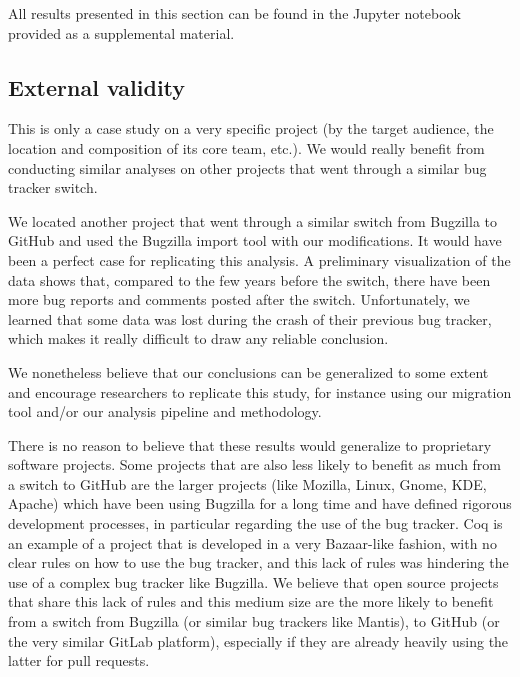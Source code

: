 \documentclass[conference]{IEEEtran}
\begin{document}
All results presented in this section can be found in the Jupyter notebook provided as a supplemental material. 
\subsection{External validity}

This is only a case study on a very specific project (by the target audience, the location and composition of its core team, etc.). We would really benefit from conducting similar analyses on other projects that went through a similar bug tracker switch.

We located another project that went through a similar switch from Bugzilla to GitHub and used the Bugzilla import tool with our modifications. It would have been a perfect case for replicating this analysis. A preliminary visualization of the data shows that, compared to the few years before the switch, there have been more bug reports and comments posted after the switch. Unfortunately, we learned that some data was lost during the crash of their previous bug tracker, which makes it really difficult to draw any reliable conclusion.

We nonetheless believe that our conclusions can be generalized to some extent and encourage researchers to replicate this study, for instance using our migration tool and/or our analysis pipeline and methodology.

There is no reason to believe that these results would generalize to proprietary software projects. Some projects that are also less likely to benefit as much from a switch to GitHub are the larger projects (like Mozilla, Linux, Gnome, KDE, Apache) which have been using Bugzilla for a long time and have defined rigorous development processes, in particular regarding the use of the bug tracker. Coq is an example of a project that is developed in a very Bazaar-like fashion, with no clear rules on how to use the bug tracker, and this lack of rules was hindering the use of a complex bug tracker like Bugzilla. We believe that open source projects that share this lack of rules and this medium size are the more likely to benefit from a switch from Bugzilla (or similar bug trackers like Mantis), to GitHub (or the very similar GitLab platform), especially if they are already heavily using the latter for pull requests.
\end{document}
